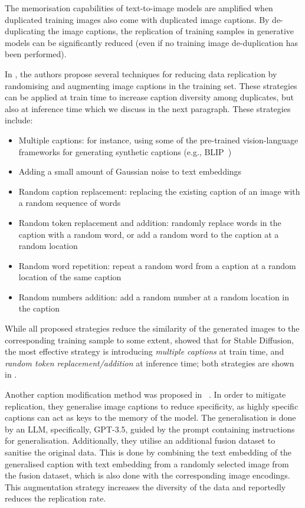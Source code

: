 \documentclass[conference,table]{IEEEtran} %
\begin{document}
The memorisation capabilities of text-to-image models are amplified when duplicated training images also come with duplicated image captions. 
By de-duplicating the image captions, the replication of training samples in generative models can be significantly reduced (even if no training image de-duplication has been performed). 

In \cite{somepalli_understanding_2023}, the authors propose several techniques for reducing data replication by randomising and augmenting image captions in the training set. 
These strategies can be applied at train time to increase caption diversity among duplicates, but also at inference time which we discuss in the next paragraph.%
These strategies include: 
\begin{itemize}
    \item Multiple captions: for instance, using some of the pre-trained vision-language frameworks for generating synthetic captions (e.g., BLIP~\cite{li_blip_2022})
    \item Adding a small amount of Gaussian noise to text embeddings
    \item Random caption replacement: replacing the existing caption of an image with a random sequence of words
    \item Random token replacement and addition: randomly replace words in the caption with a random word, or add a random word to the caption at a random location
    \item Random word repetition: repeat a random word from a caption at a random location of the same caption
    \item Random numbers addition: add a random number at a random location in the caption
\end{itemize}
While all proposed strategies reduce the similarity of the generated images to the corresponding training sample to some extent, \cite{somepalli_understanding_2023} showed that for Stable Diffusion, the most effective strategy is introducing \textit{multiple captions} at train time, and \textit{random token replacement/addition} at inference time; both strategies are shown in .

Another caption modification method was proposed in ~\cite{li_mitigate_2024}. 
In order to mitigate replication, they generalise image captions to reduce specificity, as highly specific captions can act as keys to the memory of the model. 
The generalisation is done by an LLM, specifically, GPT-3.5, guided by the prompt containing instructions for generalisation. 
Additionally, they utilise an additional fusion dataset to sanitise the original data. 
This is done by combining the text embedding of the generalised caption with text embedding from a randomly selected image from the fusion dataset, which is also done with the corresponding image encodings. This augmentation strategy increases the diversity of the data and reportedly reduces the replication rate.
\end{document}

